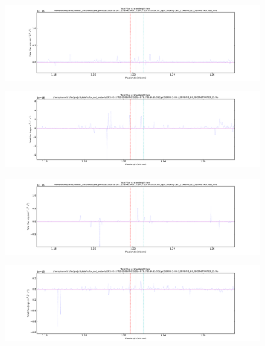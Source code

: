 \documentclass[10pt,letterpaper]{article}
\begin{document}
\begin{figure}[h!]
\includegraphics[scale=0.4]{figures/CL0036-YJ-OB-1_COMBINE_SCI_RECONSTRUCTED_4.pdf}
\end{figure}
\begin{figure}[h!]
\includegraphics[scale=0.4]{figures/CL0036-YJ-OB-1_COMBINE_SCI_RECONSTRUCTED_15.pdf}
\end{figure}
\begin{figure}[h!]
\includegraphics[scale=0.4]{figures/CL0036-YJ-OB-2_COMBINE_SCI_RECONSTRUCTED_4.pdf}
\end{figure}
\begin{figure}[h!]
\includegraphics[scale=0.4]{figures/CL0036-YJ-OB-2_COMBINE_SCI_RECONSTRUCTED_15.pdf}
\end{figure}
\hspace{1cm} \\
\hspace{1cm} \\
\hspace{1cm} \\
\end{document}
